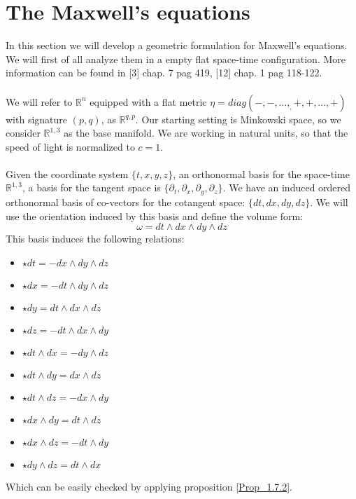 \documentclass[12pt,a4paper]{report}
\theoremstyle{definition}
\theoremstyle{Theorem}
\theoremstyle{definition}
\theoremstyle{definition}
\begin{document}
	\section{The Maxwell's equations}
	In this section we will develop a geometric formulation for Maxwell's equations. We will first of all analyze them in a empty flat space-time configuration. More information can be found in [3] chap. 7 pag 419, [12] chap. 1 pag 118-122.\\
	\\
	We will refer to $\mathbb{R}^n$ equipped with a flat metric $\eta=diag(-,-,...,_,+,+,...,+)$ with signature $(p,q)$, as $\mathbb{R}^{q,p}$. Our starting setting is Minkowski space, so we consider $\mathbb{R}^{1,3}$ as the base manifold. We are working in natural units, so that the speed of light is normalized to $c=1$.\\
	\\
	Given the coordinate system $\{t,x,y,z\}$, an orthonormal basis for the space-time $\mathbb{R}^{1,3}$, a basis for the tangent space is $\{\partial_t,\partial_x,\partial_y,\partial_z\}$. We have an induced ordered orthonormal basis of co-vectors for the cotangent space: $\{dt,dx,dy,dz\}$. We will use the orientation induced by this basis and define the volume form:
	$$\omega=dt\wedge dx\wedge dy\wedge dz$$
	This basis induces the following relations:
	\begin{multicols}{2}
		\begin{itemize}
			\item $\star dt= -dx\wedge dy\wedge dz$
			\item $\star dx= -dt\wedge dy\wedge dz$
			\item $\star dy= dt\wedge dx\wedge dz$
			\item $\star dz=-dt\wedge dx\wedge dy$
			\item $\star dt\wedge dx=-dy\wedge dz$
		\end{itemize}
		\columnbreak
		\begin{itemize}
			\item $\star dt\wedge dy=dx\wedge dz$
			\item $\star dt\wedge dz=-dx\wedge dy$
			\item $\star dx\wedge dy=dt\wedge dz$
			\item $\star dx\wedge dz=-dt\wedge dy$
			\item $\star dy\wedge dz=dt\wedge dx$
		\end{itemize} 
	\end{multicols}
	Which can be easily checked by applying proposition \ref{Prop_1.7.2}.
\end{document}
